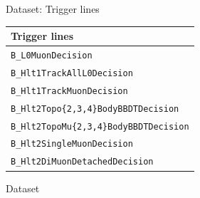 \documentclass[compress,aspectratio=1610]{beamer}
\begin{document}
\begin{frame}{Dataset: Trigger lines}
  \centering
  \begin{tabular}{l}
    \toprule
    Trigger lines \\
    \midrule
    \texttt{B\_L0MuonDecision} \\
    \texttt{B\_Hlt1TrackAllL0Decision} \\
    \texttt{B\_Hlt1TrackMuonDecision} \\
    \texttt{B\_Hlt2Topo\{2,3,4\}BodyBBDTDecision} \\
    \texttt{B\_Hlt2TopoMu\{2,3,4\}BodyBBDTDecision} \\
    \texttt{B\_Hlt2SingleMuonDecision} \\
    \texttt{B\_Hlt2DiMuonDetachedDecision} \\
    \bottomrule
  \end{tabular}
\end{frame}

\begin{frame}{Dataset}
  \centering
\end{frame}
\end{document}
